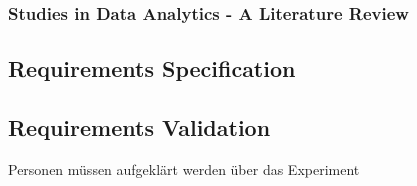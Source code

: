 \subsubsection{Studies in Data Analytics - A Literature Review }\label{subsec:literature_review_requirements}



\subsection{Requirements Specification}

\subsection{Requirements Validation}


Personen müssen aufgeklärt werden über das Experiment \cite{Dresch.2011}









